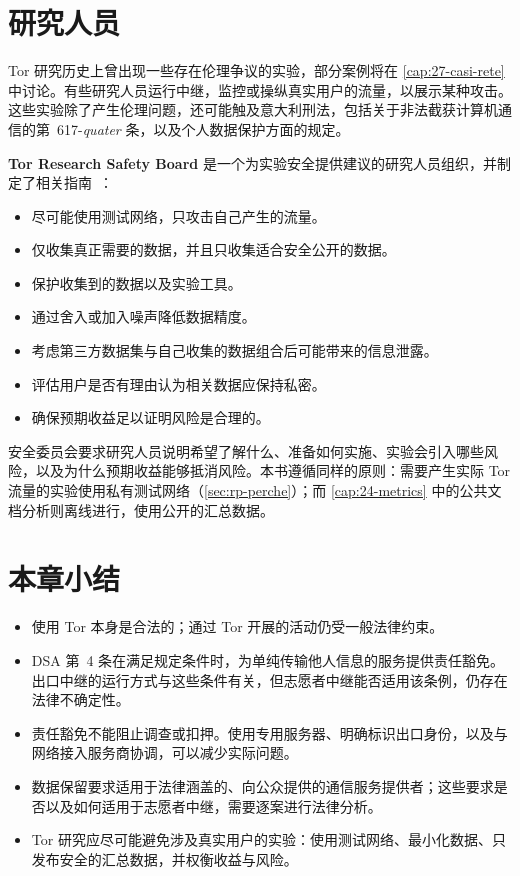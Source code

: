 \section{研究人员}\label{sec:legale-ricerca}

Tor 研究历史上曾出现一些存在伦理争议的实验，部分案例将在 \cref{cap:27-casi-rete} 中讨论。有些研究人员运行中继，监控或操纵真实用户的流量，以展示某种攻击。这些实验除了产生伦理问题，还可能触及意大利刑法，包括关于非法截获计算机通信的第~617-\emph{quater} 条，以及个人数据保护方面的规定。

\textbf{Tor Research Safety Board} 是一个为实验安全提供建议的研究人员组织，并制定了相关指南~\cite{trsb}：
\begin{itemize}
  \item 尽可能使用测试网络，只攻击自己产生的流量。
  \item 仅收集真正需要的数据，并且只收集适合安全公开的数据。
  \item 保护收集到的数据以及实验工具。
  \item 通过舍入或加入噪声降低数据精度。
  \item 考虑第三方数据集与自己收集的数据组合后可能带来的信息泄露。
  \item 评估用户是否有理由认为相关数据应保持私密。
  \item 确保预期收益足以证明风险是合理的。
\end{itemize}
安全委员会要求研究人员说明希望了解什么、准备如何实施、实验会引入哪些风险，以及为什么预期收益能够抵消风险。本书遵循同样的原则：需要产生实际 Tor 流量的实验使用私有测试网络（\cref{sec:rp-perche}）；而 \cref{cap:24-metrics} 中的公共文档分析则离线进行，使用公开的汇总数据。

\section*{本章小结}
\begin{itemize}
  \item 使用 Tor 本身是合法的；通过 Tor 开展的活动仍受一般法律约束。
  \item DSA 第~4 条在满足规定条件时，为单纯传输他人信息的服务提供责任豁免。出口中继的运行方式与这些条件有关，但志愿者中继能否适用该条例，仍存在法律不确定性。
  \item 责任豁免不能阻止调查或扣押。使用专用服务器、明确标识出口身份，以及与网络接入服务商协调，可以减少实际问题。
  \item 数据保留要求适用于法律涵盖的、向公众提供的通信服务提供者；这些要求是否以及如何适用于志愿者中继，需要逐案进行法律分析。
  \item Tor 研究应尽可能避免涉及真实用户的实验：使用测试网络、最小化数据、只发布安全的汇总数据，并权衡收益与风险。
\end{itemize}

